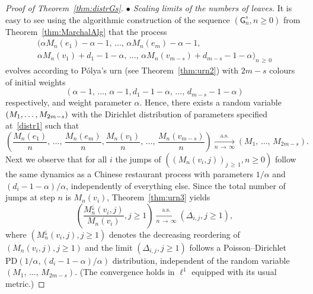 \documentclass[AHL,Unicode,longabstracts,published]{cedram}
\newcommand{\PD}{\mathrm{PD}}
\newcommand{\sG}{\mathsf{G}}
\begin{document}
\begin{proof}[Proof of Theorem~\ref{thm:distrGs}]
\emph{$\bullet$ Scaling limits of the numbers of leaves.} It is easy to see using the algorithmic construction of the sequence $(\sG_n^s,n\geq 0)$ from Theorem~\ref{thm:MarchalAlg} that the process
\begin{multline*}
\big(\alpha M_n(e_1)-\alpha-1,\,\ldots,\,\alpha M_n(e_m)-\alpha-1, \\
\alpha M_n(v_1)+d_1-1-\alpha,\,\ldots,\,\alpha M_n\left(v_{m-s}\right) + d_{m-s} - 1 - \alpha \big)_{n\,\geq\,0}
\end{multline*}
evolves according to P\'olya's urn (see Theorem~\ref{thm:urn2}) with $2m-s$ colours of initial weights
\[
\left(\alpha-1,\,\ldots,\,\alpha-1,d_1-1-\alpha,\,\ldots,\,d_{m-s}-1-\alpha\right)
\]
respectively, and weight parameter $\alpha$. Hence, there exists a random variable $(M_1,\ldots,\linebreak M_{2m-s})$ with the Dirichlet distribution of parameters specified at~\eqref{distr1} such that
\[
\left(\frac{M_n(e_1)}{n},\,\ldots,\,\frac{M_n(e_m)}{n},\frac{M_n(v_1)}{n},\,\ldots,\,\frac{M_n\left(v_{m-s}\right)}{n}\right) \underset{n \,\rightarrow\,\infty}{\overset{\text{a.s.}}\longrightarrow} \left(M_1,\,\ldots,\,M_{2m-s}\right).
\]
Next we observe that for all $i$ the jumps of $((M_{n}(v_{i},j))_{j\,\geq\,1},n \geq 0)$ follow the same dynamics as a Chinese restaurant process with parameters $1/\alpha$ and $(d_i-1-\alpha)/\alpha$, independently of everything else. Since the total number of jumps at step $n$ is $M_n(v_i)$, Theorem~\ref{thm:urn3} yields
\[
\left(\frac{M^{\downarrow}_{n}\left(v_{i},j\right)}{M_n(v_i)},j\geq 1\right) \underset{n\,\rightarrow \,\infty}{\overset{\text{a.s.}}\longrightarrow} \left(\Delta_{i,j},j\geq 1\right),
\]
where $(M^{\downarrow}_{n}(v_{i},j),j\geq 1)$ denotes the decreasing reordering of $(M_{n}(v_{i},j),j\geq 1)$ and the limit $(\Delta_{i,j},j\geq 1)$ follows a Poisson--Dirichlet $\PD(1/\alpha, (d_i-1-\alpha)/\alpha)$ distribution, independent of the random variable $(M_1,\,\ldots,\,M_{2m-s})$. (The convergence holds in $\ell^1$ equipped with its usual metric.)

\vspace{4pt}


\end{proof}
\end{document}
